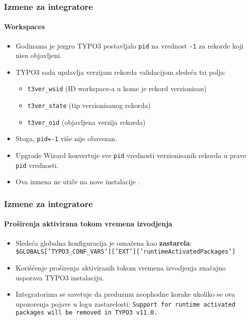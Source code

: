 \begin{frame}[fragile]
	\frametitle{Izmene za integratore}
	\framesubtitle{Workspaces}

	\begin{itemize}
		\item Godinama je jezgro TYPO3 postavljalo \texttt{pid} na vrednost \texttt{-1} za rekorde koji nisu objavljeni.
		\item TYPO3 sada updavlja verzijam rekorda validacijom sledeća tri polja:

			\begin{itemize}
				\item \texttt{t3ver\_wsid} (ID workspace-a u kome je rekord verzionisan)
				\item \texttt{t3ver\_state} (tip verzionisanog rekorda)
				\item \texttt{t3ver\_oid} (objavljena verzija rekorda)
			\end{itemize}

		\item Stoga, \texttt{pid=-1} više nije obavezan.
		\item Upgrade Wizard konvertuje sve \texttt{pid} vrednosti verzionisanih rekorda
			u prave \texttt{pid} vrednosti.
		\item Ova izmena ne utiče na nove instalacije .

	\end{itemize}

\end{frame}


\begin{frame}[fragile]
	\frametitle{Izmene za integratore}
	\framesubtitle{Proširenja aktivirana tokom vremena izvodjenja}

	\begin{itemize}
		\item Sledeća globalna konfiguracija je označena kao \textbf{zastarela}:\newline
			\smaller
				\texttt{\$GLOBALS['TYPO3\_CONF\_VARS']['EXT']['runtimeActivatedPackages']}
			\normalsize
		\item Korišćenje proširenja aktiviranih tokom vremena izvodjenja značajno usporava TYPO3 instalaciju.
		\item Integratorima se savetuje da preduzmu neophodne korake ukoliko se ova upozorenja pojave u logu zastarelosti:\newline
			\begingroup
				\fontsize{8}{10}
				\texttt{Support for runtime activated packages will be removed in TYPO3 v11.0.}
			\endgroup

	\end{itemize}

\end{frame}

